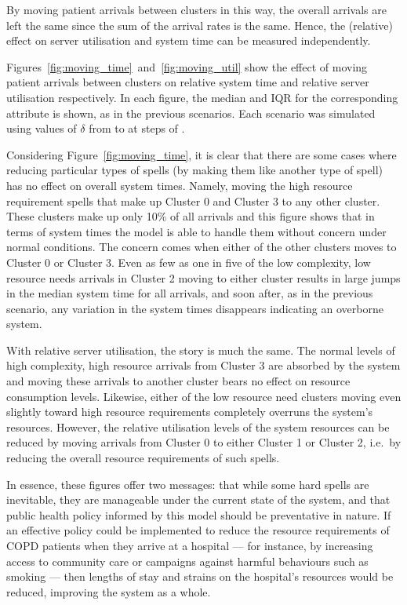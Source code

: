 By moving patient arrivals between clusters in this way, the overall arrivals
are left the same since the sum of the arrival rates is the same. Hence, the
(relative) effect on server utilisation and system time can be measured
independently.

Figures~\ref{fig:moving_time}~and~\ref{fig:moving_util} show the effect of
moving patient arrivals between clusters on relative system time and relative
server utilisation respectively. In each figure, the median and IQR for the
corresponding attribute is shown, as in the previous scenarios. Each scenario
was simulated using values of \(\delta\) from  to
 at steps of .

Considering Figure~\ref{fig:moving_time}, it is clear that there are some cases
where reducing particular types of spells (by making them like another type of
spell) has no effect on overall system times. Namely, moving the high
resource requirement spells that make up Cluster 0 and Cluster 3 to any other
cluster. These clusters make up only 10\% of all arrivals and this figure shows
that in terms of system times the model is able to handle them without concern
under normal conditions. The concern comes when either of the other clusters
moves to Cluster 0 or Cluster 3. Even as few as one in five of the low
complexity, low resource needs arrivals in Cluster 2 moving to either cluster
results in large jumps in the median system time for all arrivals, and soon
after, as in the previous scenario, any variation in the system times
disappears indicating an overborne system.

With relative server utilisation, the story is much the same. The normal levels
of high complexity, high resource arrivals from Cluster 3 are absorbed by the
system and moving these arrivals to another cluster bears no effect on resource
consumption levels. Likewise, either of the low resource need clusters moving
even slightly toward high resource requirements completely overruns the system's
resources. However, the relative utilisation levels of the system resources can
be reduced by moving arrivals from Cluster 0 to either Cluster 1 or Cluster 2,
i.e.\ by reducing the overall resource requirements of such spells.

In essence, these figures offer two messages: that while some hard spells are
inevitable, they are manageable under the current state of the system, and that
public health policy informed by this model should be preventative in nature. If
an effective policy could be implemented to reduce the resource requirements of
COPD patients when they arrive at a hospital --- for instance, by increasing
access to community care or campaigns against harmful behaviours such as smoking
--- then lengths of stay and strains on the hospital's resources would be
reduced, improving the system as a whole.

